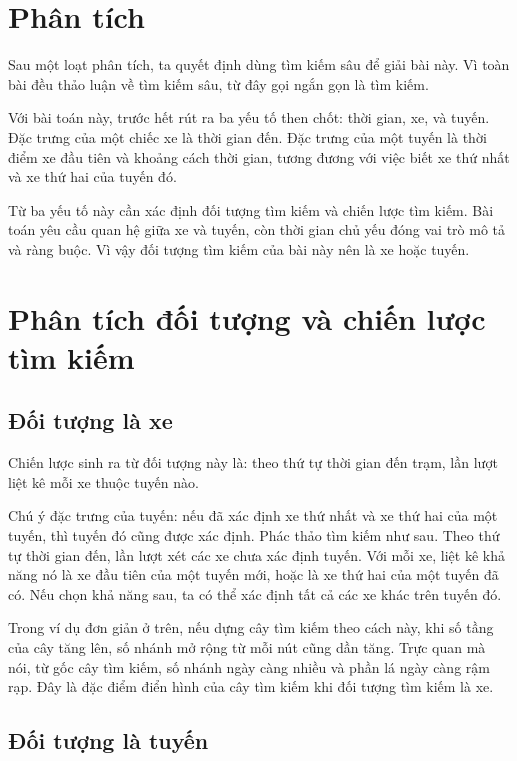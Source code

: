 \documentclass[11pt]{article}
\begin{document}
\section{Phân tích}

Sau một loạt phân tích, ta quyết định dùng tìm kiếm sâu để giải bài này. Vì
toàn bài đều thảo luận về tìm kiếm sâu, từ đây gọi ngắn gọn là tìm kiếm.

Với bài toán này, trước hết rút ra ba yếu tố then chốt: thời gian, xe, và
tuyến. Đặc trưng của một chiếc xe là thời gian đến. Đặc trưng của một tuyến
là thời điểm xe đầu tiên và khoảng cách thời gian, tương đương với việc biết
xe thứ nhất và xe thứ hai của tuyến đó.

Từ ba yếu tố này cần xác định đối tượng tìm kiếm và chiến lược tìm kiếm. Bài
toán yêu cầu quan hệ giữa xe và tuyến, còn thời gian chủ yếu đóng vai trò mô
tả và ràng buộc. Vì vậy đối tượng tìm kiếm của bài này nên là xe hoặc tuyến.

\section{Phân tích đối tượng và chiến lược tìm kiếm}

\subsection{Đối tượng là xe}

Chiến lược sinh ra từ đối tượng này là: theo thứ tự thời gian đến trạm, lần
lượt liệt kê mỗi xe thuộc tuyến nào.

Chú ý đặc trưng của tuyến: nếu đã xác định xe thứ nhất và xe thứ hai của một
tuyến, thì tuyến đó cũng được xác định. Phác thảo tìm kiếm như sau. Theo thứ
tự thời gian đến, lần lượt xét các xe chưa xác định tuyến. Với mỗi xe, liệt kê
khả năng nó là xe đầu tiên của một tuyến mới, hoặc là xe thứ hai của một tuyến
đã có. Nếu chọn khả năng sau, ta có thể xác định tất cả các xe khác trên tuyến
đó.

Trong ví dụ đơn giản ở trên, nếu dựng cây tìm kiếm theo cách này, khi số tầng
của cây tăng lên, số nhánh mở rộng từ mỗi nút cũng dần tăng. Trực quan mà
nói, từ gốc cây tìm kiếm, số nhánh ngày càng nhiều và phần lá ngày càng rậm
rạp. Đây là đặc điểm điển hình của cây tìm kiếm khi đối tượng tìm kiếm là xe.

\subsection{Đối tượng là tuyến}
\end{document}
